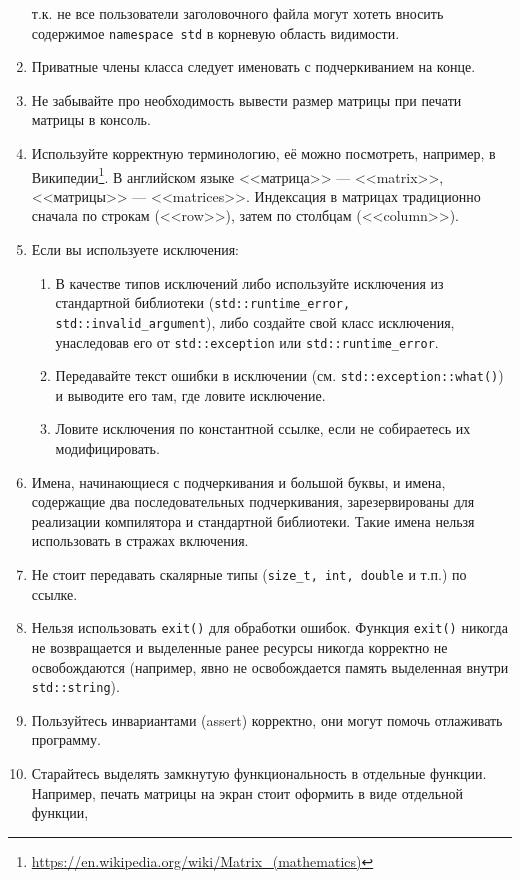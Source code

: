 \documentclass[a4paper,10pt]{article}
\begin{document}
\begin{enumerate}
    т.к. не все пользователи заголовочного файла могут хотеть вносить
    содержимое {\tt namespace std} в корневую область видимости.
    \item Приватные члены класса следует именовать с подчеркиванием на конце.
    \item Не забывайте про необходимость вывести размер матрицы при печати матрицы в консоль.
    \item Используйте корректную терминологию, её можно посмотреть, например,
    в Википедии\footnote{\url{https://en.wikipedia.org/wiki/Matrix_(mathematics)}}.
    В английском языке <<матрица>> --- <<matrix>>, <<матрицы>> --- <<matrices>>.
    Индексация в матрицах традиционно сначала по строкам (<<row>>),
    затем по столбцам (<<column>>).
    \item Если вы используете исключения:
    \begin{enumerate}
        \item В качестве типов исключений либо
        используйте исключения из стандартной библиотеки
        ({\tt std::runtime_error, std::invalid_argument}), либо создайте свой класс
        исключения, унаследовав его от {\tt std::exception} или {\tt std::runtime_error}.
        \item Передавайте текст ошибки в исключении (см. {\tt std::exception::what()}) и
    	выводите его там, где ловите исключение.
    	\item Ловите исключения по константной ссылке, если не собираетесь их модифицировать.
    \end{enumerate}
    \item Имена, начинающиеся с подчеркивания и большой буквы, и имена,
    содержащие два последовательных подчеркивания,
    зарезервированы для реализации компилятора и стандартной библиотеки.
    Такие имена нельзя использовать в стражах включения.
    \item Не стоит передавать скалярные типы ({\tt size_t, int, double} и т.п.) по ссылке.
    \item Нельзя использовать {\tt exit()} для обработки ошибок.
    Функция {\tt exit()} никогда не возвращается и выделенные ранее ресурсы никогда корректно не освобождаются
    (например, явно не освобождается память выделенная внутри {\tt std::string}).
    \item Пользуйтесь инвариантами (assert) корректно, они могут помочь отлаживать программу.
    \item Старайтесь выделять замкнутую функциональность в отдельные функции.
    Например, печать матрицы на экран стоит оформить в виде отдельной функции,

\end{enumerate}
\end{document}
